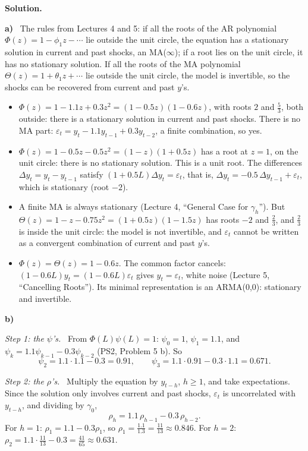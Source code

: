 \documentclass[11pt]{article}
\newcommand{\itm}[1]{\par\needspace{4\baselineskip}\textbf{#1)}\ }
\newcommand{\solution}{\par\textcolor{FGVBlue}{\textbf{Solution.}}\par}
\newcommand{\step}[1]{\par\emph{Step #1.}\ }
\begin{document}
\solution
\itm{a}
The rules from Lectures 4 and 5: if all the roots of the AR polynomial $\Phi(z)=1-\phi_1z-\cdots$ lie outside the unit circle, the equation has a stationary solution in current and past shocks, an MA($\infty$); if a root lies on the unit circle, it has no stationary solution. If all the roots of the MA polynomial $\Theta(z)=1+\theta_1z+\cdots$ lie outside the unit circle, the model is invertible, so the shocks can be recovered from current and past $y$'s.
\begin{itemize}
	\item[(i)] $\Phi(z)=1-1.1z+0.3z^2=(1-0.5z)(1-0.6z)$, with roots $2$ and $\frac53$, both outside: there is a stationary solution in current and past shocks. There is no MA part: $\varepsilon_t=y_t-1.1y_{t-1}+0.3y_{t-2}$, a finite combination, so yes.
	\item[(ii)] $\Phi(z)=1-0.5z-0.5z^2=(1-z)(1+0.5z)$ has a root at $z=1$, on the unit circle: there is no stationary solution. This is a unit root. The differences $\Delta y_t=y_t-y_{t-1}$ satisfy $(1+0.5L)\Delta y_t=\varepsilon_t$, that is, $\Delta y_t=-0.5\,\Delta y_{t-1}+\varepsilon_t$, which is stationary (root $-2$).
	\item[(iii)] A finite MA is always stationary (Lecture 4, ``General Case for $\gamma_h$''). But $\Theta(z)=1-z-0.75z^2=(1+0.5z)(1-1.5z)$ has roots $-2$ and $\frac23$, and $\frac23$ is inside the unit circle: the model is not invertible, and $\varepsilon_t$ cannot be written as a convergent combination of current and past $y$'s.
	\item[(iv)] $\Phi(z)=\Theta(z)=1-0.6z$. The common factor cancels: $(1-0.6L)y_t=(1-0.6L)\varepsilon_t$ gives $y_t=\varepsilon_t$, white noise (Lecture 5, ``Cancelling Roots''). Its minimal representation is an ARMA(0,0): stationary and invertible.
\end{itemize}

\itm{b}
\step{1: the $\psi$'s} From $\Phi(L)\psi(L)=1$: $\psi_0=1$, $\psi_1=1.1$, and $\psi_k=1.1\psi_{k-1}-0.3\psi_{k-2}$ (PS2, Problem 5 b). So
\[
\psi_2=1.1\cdot1.1-0.3=0.91,\qquad\psi_3=1.1\cdot0.91-0.3\cdot1.1=0.671 .
\]
\step{2: the $\rho$'s} Multiply the equation by $y_{t-h}$, $h\ge1$, and take expectations. Since the solution only involves current and past shocks, $\varepsilon_t$ is uncorrelated with $y_{t-h}$, and dividing by $\gamma_0$,
\[
\rho_h=1.1\,\rho_{h-1}-0.3\,\rho_{h-2}.
\]
For $h=1$: $\rho_1=1.1-0.3\rho_1$, so $\rho_1=\frac{1.1}{1.3}=\frac{11}{13}\approx0.846$. For $h=2$: $\rho_2=1.1\cdot\frac{11}{13}-0.3=\frac{41}{65}\approx0.631$.
\end{document}
